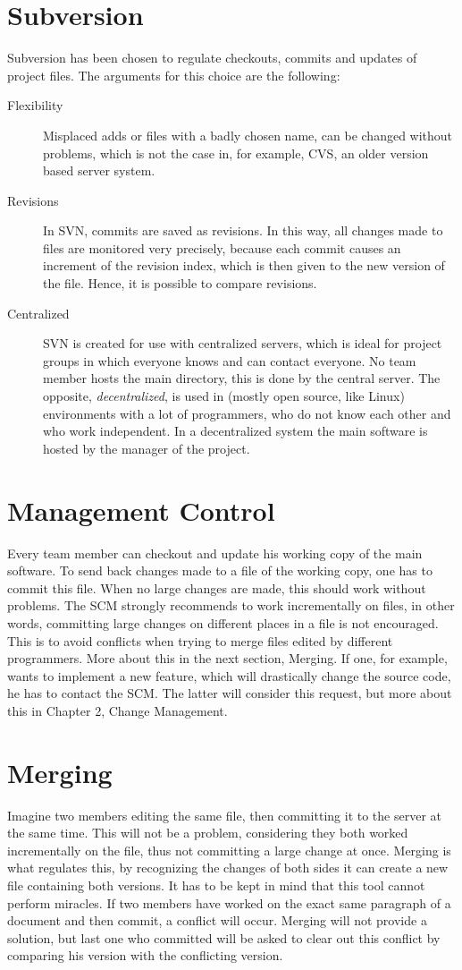 \documentclass{report}
\begin{document}
\section{Subversion}
Subversion has been chosen to regulate checkouts, commits and updates of project files.
The arguments for this choice are the following:
\begin{description}
\item[Flexibility]
Misplaced adds or files with a badly chosen name, can be changed without problems, which is not the case in, for example, CVS, an older version based server system.
\item[Revisions]
In SVN, commits are saved as revisions.
In this way, all changes made to files are monitored very precisely, because each commit causes an increment of the revision index, which is then given to the new version of the file.
Hence, it is possible to compare revisions.
\item[Centralized]
SVN is created for use with centralized servers, which is ideal for project groups in which everyone knows and can contact everyone.
No team member hosts the main directory, this is done by the central server.
The opposite, {\it decentralized}, is used in (mostly open source, like Linux) environments with a lot of programmers, who do not know each other and who work independent.
In a decentralized system the main software is hosted by the manager of the project.
\end{description}
\section{Management Control}
Every team member can checkout and update his working copy of the main software.
To send back changes made to a file of the working copy, one has to commit this file.
When no large changes are made, this should work without problems.
The SCM strongly recommends to work incrementally on files, in other words, committing large changes on different places in a file is not encouraged.
This is to avoid conflicts when trying to merge files edited by different programmers. More about this in the next section, Merging.
If one, for example, wants to implement a new feature, which will drastically change the source code, he has to contact the SCM. The latter will consider this request, but more about this in Chapter 2, Change Management.
\section{Merging}
Imagine two members editing the same file, then committing it to the server at the same time.
This will not be a problem, considering they both worked incrementally on the file, thus not committing a large change at once.
Merging is what regulates this, by recognizing the changes of both sides it can create a new file containing both versions.
It has to be kept in mind that this tool cannot perform miracles.
If two members have worked on the exact same paragraph of a document and then commit, a conflict will occur.
Merging will not provide a solution, but last one who committed will be asked to clear out this conflict by comparing his version with the conflicting version.
\end{document}
